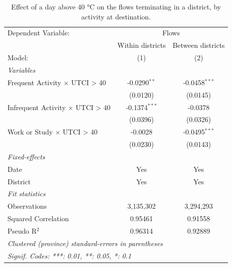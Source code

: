 
\begin{table}[htbp]
   \caption{\label{table_s2_reproduction} Effect of a day above 40 °C on the flows terminating in a district, by activity at destination.}
   \centering
   \small
   \begin{tabular}{lcc}
      \tabularnewline \midrule \midrule
      Dependent Variable: & \multicolumn{2}{c}{Flows}\\
                                              & Within districts & Between districts \\   
      Model:                                  & (1)              & (2)\\  
      \midrule
      \emph{Variables}\\
      Frequent Activity $\times$ UTCI > 40    & -0.0290$^{**}$   & -0.0458$^{***}$\\   
                                              & (0.0120)         & (0.0145)\\   
      Infrequent Activity $\times$ UTCI > 40  & -0.1374$^{***}$  & -0.0378\\   
                                              & (0.0396)         & (0.0326)\\   
      Work or Study $\times$ UTCI > 40        & -0.0028          & -0.0495$^{***}$\\   
                                              & (0.0230)         & (0.0143)\\   
      \midrule
      \emph{Fixed-effects}\\
      Date                                    & Yes              & Yes\\  
      District                                & Yes              & Yes\\  
      \midrule
      \emph{Fit statistics}\\
      Observations                            & 3,135,302        & 3,294,293\\  
      Squared Correlation                     & 0.95461          & 0.91558\\  
      Pseudo R$^2$                            & 0.96314          & 0.92889\\  
      \midrule \midrule
      \multicolumn{3}{l}{\emph{Clustered (province) standard-errors in parentheses}}\\
      \multicolumn{3}{l}{\emph{Signif. Codes: ***: 0.01, **: 0.05, *: 0.1}}\\
   \end{tabular}
\end{table}


